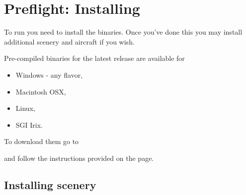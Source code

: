 
\chapter{Preflight: Installing \FlightGear{} \label{prefligh}}

To run \FlightGear{} you need to install the binaries. Once you've done this you may install additional scenery and aircraft if you wish.

Pre-compiled binaries for the latest release are available for 

\begin{itemize}
\item Windows - any flavor,
\item Macintosh OSX,
\item Linux,
\item SGI Irix.
\end{itemize}

To download them go to 

\medskip
{}
\medskip

and follow the instructions provided on the page.

\section{Installing scenery}


